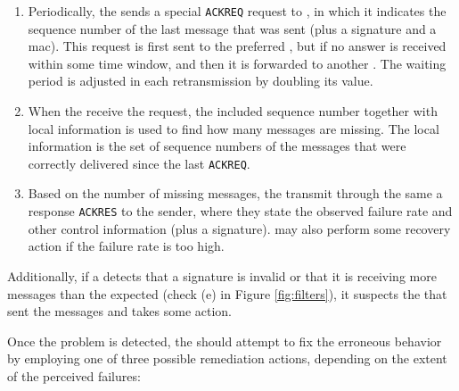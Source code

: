 \begin{enumerate}

\item Periodically, the \sender sends a special \texttt{ACKREQ} request to \repsieves, in which it indicates the sequence number of the last message that was sent (plus a signature and a \gls{mac}).
This request is first sent to the preferred \presieve, but if no answer is received within some time window, and then it is forwarded to another \presieve.
The waiting period is adjusted in each retransmission by doubling its value.

\item When the \repsieves receive the request, the included sequence number together with local information is used to find how many messages are missing. 
The local information is the set of sequence numbers of the messages that were correctly delivered since the last \texttt{ACKREQ}.

\item Based on the number of missing messages, the \repsieves transmit through the same \presieve a response \texttt{ACKRES} to the sender, where they state the observed failure rate and other control information (plus a signature).
\Repsieves may also perform some recovery action if the failure rate is too high.

\end{enumerate}

Additionally, if a \repsieve detects that a signature is invalid or that it is receiving more messages than the expected (check (e) in Figure \ref{fig:filters}), it suspects the \presieve that sent the messages and takes some action.


Once the problem is detected, the \repsieves should attempt to fix the erroneous behavior by employing one of three possible remediation actions, depending on the extent of the perceived failures:

